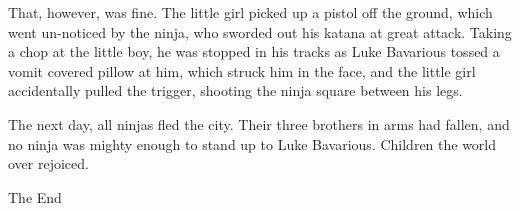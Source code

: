 That, however, was fine. The little girl picked up a pistol off the
ground, which went un-noticed by the ninja, who sworded out his
katana at great attack. Taking a chop at the little boy, he was
stopped in his tracks as Luke Bavarious tossed a vomit covered
pillow at him, which struck him in the face, and the little girl
accidentally pulled the trigger, shooting the ninja square between
his legs.



The next day, all ninjas fled the city. Their three brothers in
arms had fallen, and no ninja was mighty enough to stand up to Luke
Bavarious. Children the world over rejoiced.



The End
 



